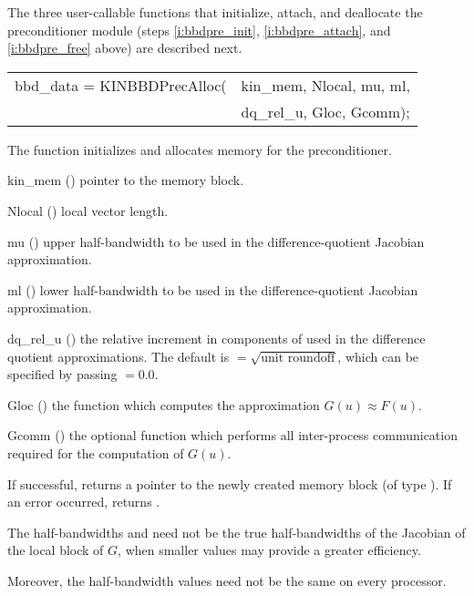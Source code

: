The three user-callable functions that initialize, attach, and deallocate
the {\kinbbdpre} preconditioner module (steps \ref{i:bbdpre_init},
\ref{i:bbdpre_attach}, and \ref{i:bbdpre_free} above) are described
next.
{
   \begin{tabular}[t]{@{}r@{}l@{}}
     bbd\_data = KINBBDPrecAlloc(&kin\_mem, Nlocal, mu, ml, \\
                                 &dq\_rel\_u, Gloc, Gcomm);
   \end{tabular}
}
{
  The function  initializes and allocates
  memory for the {\kinbbdpre} preconditioner.
}
{
  \begin{args}[dq\_rel\_u]
  \item[kin\_mem] ()
    pointer to the {\kinsol} memory block.
  \item[Nlocal] ()
    local vector length.
  \item[mu] ()
    upper half-bandwidth to be used in the difference-quotient Jacobian approximation.
  \item[ml] ()
    lower half-bandwidth to be used in the difference-quotient Jacobian approximation.
  \item[dq\_rel\_u] ()
    the relative increment in components of  used in the difference quotient
    approximations.  The default is $ = \sqrt{\text{unit roundoff}}$,
    which can be specified by passing $ = 0.0$.
  \item[Gloc] ()
    the {\C} function which computes the approximation $G(u) \approx F(u)$. 
  \item[Gcomm] ()
    the optional {\C} function which performs all inter-process communication required for
    the computation of $G(u)$.
  \end{args}
}
{
  If successful,  returns a pointer to the newly created 
  {\kinbbdpre} memory block (of type ).
  If an error occurred,  returns .
}
{
  The half-bandwidths  and  need not be the true 
  half-bandwidths of the Jacobian of the local block of $G$,    
  when smaller values may provide a greater efficiency.       

  Moreover, the half-bandwidth values need not be the same on every processor.
}
